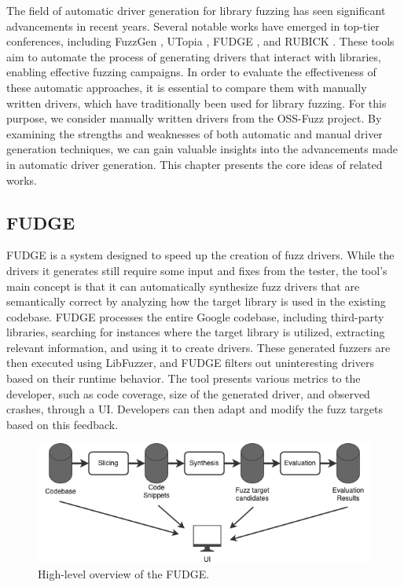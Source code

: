 \documentclass[a4paper,11pt,oneside]{report}
\begin{document}
The field of automatic driver generation for library fuzzing 
has seen significant advancements in recent years. Several 
notable works have emerged in top-tier conferences, including FuzzGen \cite{fuzzgen}, 
UTopia \cite{utopia}, FUDGE \cite{fudge}, and RUBICK \cite{rubick}.
These tools aim to automate the process of generating drivers 
that interact with libraries, enabling effective fuzzing campaigns. 
In order to evaluate the effectiveness of these automatic approaches, 
it is essential to compare them with manually written drivers,
which have traditionally been used for library fuzzing. 
For this purpose, we consider manually written drivers from the OSS-Fuzz project. 
By examining the strengths and weaknesses of both automatic 
and manual driver generation techniques, we can gain valuable 
insights into the advancements made in automatic driver generation.
This chapter presents the core ideas of related works.


\subsection{FUDGE}
FUDGE is a system designed to speed up the creation of 
fuzz drivers. While the drivers it generates still require 
some input and fixes from the tester, the tool's main concept 
is that it can automatically synthesize fuzz drivers that are 
semantically correct by analyzing how the target library is 
used in the existing codebase. FUDGE processes the entire 
Google codebase, including third-party libraries, 
searching for instances where the target library is 
utilized, extracting relevant information, and using 
it to create drivers. These generated fuzzers are then 
executed using LibFuzzer, and FUDGE filters out
uninteresting drivers based on their runtime behavior. 
The tool presents various metrics to the developer, 
such as code coverage, size of the generated driver, 
and observed crashes, through a UI. 
Developers can then adapt and modify the fuzz 
targets based on this feedback.

\begin{figure}[ht]
	\centering
	\includegraphics[width=12cm]{figures/fudge.png}
	\caption{High-level overview of the FUDGE.}
	\label{fig:fudge}
\end{figure}
\end{document}
